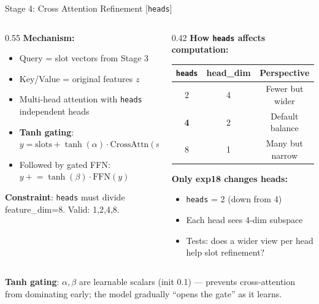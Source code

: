\documentclass[aspectratio=169, 10pt]{beamer}
\newcommand{\param}[1]{\textcolor{paramred}{\texttt{#1}}}
\begin{document}
\begin{frame}{Stage 4: Cross Attention Refinement \quad\small[\param{heads}]}

\begin{columns}[T]
\begin{column}{0.55\textwidth}
\textbf{Mechanism:}
\begin{itemize}
    \item Query = slot vectors from Stage 3
    \item Key/Value = original features $z$
    \item Multi-head attention with \param{heads} independent heads
    \item \textbf{Tanh gating}: $y = \text{slots} + \tanh(\alpha) \cdot \text{CrossAttn}(\text{slots}, z)$
    \item Followed by gated FFN: $y \mathrel{+}= \tanh(\beta) \cdot \text{FFN}(y)$
\end{itemize}

\vspace{0.1cm}
{\small\textbf{Constraint}: \param{heads} must divide feature\_dim=8. Valid: 1,2,4,8.}
\end{column}
\begin{column}{0.42\textwidth}
\textbf{How \param{heads} affects computation:}

\vspace{0.2cm}
\small
\begin{tabular}{ccc}
\toprule
\param{heads} & head\_dim & Perspective \\
\midrule
2 & 4 & Fewer but wider \\
\textbf{4} & 2 & Default balance \\
8 & 1 & Many but narrow \\
\bottomrule
\end{tabular}

\vspace{0.2cm}
\textbf{Only exp18 changes heads:}
\begin{itemize}
    \item \param{heads} = 2 (down from 4)
    \item Each head sees 4-dim subspace
    \item Tests: does a wider view per head help slot refinement?
\end{itemize}
\end{column}
\end{columns}

\vspace{0.1cm}
\small
\textbf{Tanh gating}: $\alpha, \beta$ are learnable scalars (init 0.1) --- prevents cross-attention from dominating early; the model gradually ``opens the gate'' as it learns.

\end{frame}
\end{document}
